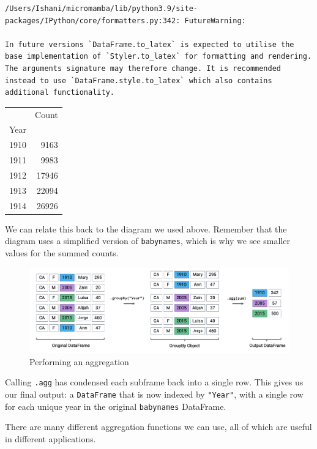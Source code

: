\documentclass[
  letterpaper,
  DIV=11,
  numbers=noendperiod]{scrreprt}
\begin{document}
\begin{verbatim}
/Users/Ishani/micromamba/lib/python3.9/site-packages/IPython/core/formatters.py:342: FutureWarning:

In future versions `DataFrame.to_latex` is expected to utilise the base implementation of `Styler.to_latex` for formatting and rendering. The arguments signature may therefore change. It is recommended instead to use `DataFrame.style.to_latex` which also contains additional functionality.
\end{verbatim}

\begin{tabular}{lr}
\toprule
{} &  Count \\
Year &        \\
\midrule
1910 &   9163 \\
1911 &   9983 \\
1912 &  17946 \\
1913 &  22094 \\
1914 &  26926 \\
\bottomrule
\end{tabular}

We can relate this back to the diagram we used above. Remember that the
diagram uses a simplified version of \texttt{babynames}, which is why we
see smaller values for the summed counts.

\begin{figure}

{\centering \includegraphics{pandas_3/images/agg.png}

}

\caption{Performing an aggregation}

\end{figure}

Calling \texttt{.agg} has condensed each subframe back into a single
row. This gives us our final output: a \texttt{DataFrame} that is now
indexed by \texttt{"Year"}, with a single row for each unique year in
the original \texttt{babynames} DataFrame.

There are many different aggregation functions we can use, all of which
are useful in different applications.
\end{document}
